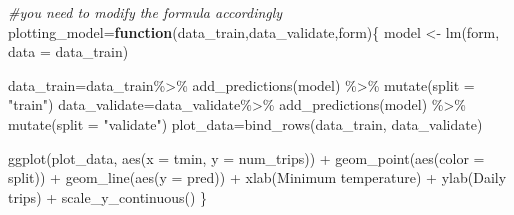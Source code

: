 \documentclass[
]{article}
\newenvironment{Shaded}{\begin{snugshade}}{\end{snugshade}}
\newcommand{\AttributeTok}[1]{\textcolor[rgb]{0.77,0.63,0.00}{#1}}
\newcommand{\CommentTok}[1]{\textcolor[rgb]{0.56,0.35,0.01}{\textit{#1}}}
\newcommand{\ControlFlowTok}[1]{\textcolor[rgb]{0.13,0.29,0.53}{\textbf{#1}}}
\newcommand{\FunctionTok}[1]{\textcolor[rgb]{0.00,0.00,0.00}{#1}}
\newcommand{\NormalTok}[1]{#1}
\newcommand{\OtherTok}[1]{\textcolor[rgb]{0.56,0.35,0.01}{#1}}
\newcommand{\SpecialCharTok}[1]{\textcolor[rgb]{0.00,0.00,0.00}{#1}}
\newcommand{\StringTok}[1]{\textcolor[rgb]{0.31,0.60,0.02}{#1}}
\begin{document}
\begin{Shaded}
\begin{Highlighting}[]
\CommentTok{\#you need to modify the formula accordingly}
\NormalTok{plotting\_model}\OtherTok{=}\ControlFlowTok{function}\NormalTok{(data\_train,data\_validate,form)\{}
\NormalTok{  model }\OtherTok{\textless{}{-}} \FunctionTok{lm}\NormalTok{(form, }\AttributeTok{data =}\NormalTok{ data\_train)}
  
\NormalTok{  data\_train}\OtherTok{=}\NormalTok{data\_train}\SpecialCharTok{\%\textgreater{}\%}
    \FunctionTok{add\_predictions}\NormalTok{(model) }\SpecialCharTok{\%\textgreater{}\%}
    \FunctionTok{mutate}\NormalTok{(}\AttributeTok{split =} \StringTok{"train"}\NormalTok{)}
\NormalTok{  data\_validate}\OtherTok{=}\NormalTok{data\_validate}\SpecialCharTok{\%\textgreater{}\%}
    \FunctionTok{add\_predictions}\NormalTok{(model) }\SpecialCharTok{\%\textgreater{}\%}
    \FunctionTok{mutate}\NormalTok{(}\AttributeTok{split =} \StringTok{"validate"}\NormalTok{)}
\NormalTok{  plot\_data}\OtherTok{=}\FunctionTok{bind\_rows}\NormalTok{(data\_train, data\_validate)}
  
  
  \FunctionTok{ggplot}\NormalTok{(plot\_data, }\FunctionTok{aes}\NormalTok{(}\AttributeTok{x =}\NormalTok{ tmin, }\AttributeTok{y =}\NormalTok{ num\_trips)) }\SpecialCharTok{+}
    \FunctionTok{geom\_point}\NormalTok{(}\FunctionTok{aes}\NormalTok{(}\AttributeTok{color =}\NormalTok{ split)) }\SpecialCharTok{+}
    \FunctionTok{geom\_line}\NormalTok{(}\FunctionTok{aes}\NormalTok{(}\AttributeTok{y =}\NormalTok{ pred)) }\SpecialCharTok{+}
    \FunctionTok{xlab}\NormalTok{(}\StringTok{\textquotesingle{}Minimum temperature\textquotesingle{}}\NormalTok{) }\SpecialCharTok{+}
    \FunctionTok{ylab}\NormalTok{(}\StringTok{\textquotesingle{}Daily trips\textquotesingle{}}\NormalTok{) }\SpecialCharTok{+}
    \FunctionTok{scale\_y\_continuous}\NormalTok{()}
\NormalTok{\}}
\end{Highlighting}
\end{Shaded}
\end{document}
